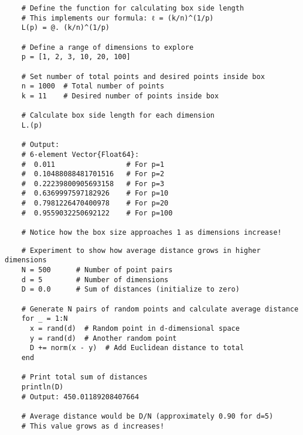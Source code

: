 \documentclass[12pt]{article}
\begin{document}
\begin{tcolorbox}[width=\textwidth, left=-6mm, sharp corners, boxrule=0pt, title=\textbf{Implementing the box size formula}]
  \begin{verbatim}
    # Define the function for calculating box side length
    # This implements our formula: ℓ = (k/n)^(1/p)
    L(p) = @. (k/n)^(1/p)
    
    # Define a range of dimensions to explore
    p = [1, 2, 3, 10, 20, 100]
    
    # Set number of total points and desired points inside box
    n = 1000  # Total number of points
    k = 11    # Desired number of points inside box
    
    # Calculate box side length for each dimension
    L.(p)
    
    # Output:
    # 6-element Vector{Float64}:
    #  0.011                 # For p=1
    #  0.10488088481701516   # For p=2
    #  0.22239800905693158   # For p=3
    #  0.6369997597182926    # For p=10
    #  0.7981226470400978    # For p=20
    #  0.9559032250692122    # For p=100
    
    # Notice how the box size approaches 1 as dimensions increase!
  \end{verbatim}
\end{tcolorbox}

\begin{tcolorbox}[width=\textwidth, left=-6mm, sharp corners, boxrule=0pt, title=\textbf{Experiment: Average distance in high dimensions}]
  \begin{verbatim}
    # Experiment to show how average distance grows in higher dimensions
    N = 500      # Number of point pairs
    d = 5        # Number of dimensions
    D = 0.0      # Sum of distances (initialize to zero)
    
    # Generate N pairs of random points and calculate average distance
    for _ = 1:N
      x = rand(d)  # Random point in d-dimensional space
      y = rand(d)  # Another random point
      D += norm(x - y)  # Add Euclidean distance to total
    end
    
    # Print total sum of distances
    println(D)
    # Output: 450.01189208407664
    
    # Average distance would be D/N (approximately 0.90 for d=5)
    # This value grows as d increases!
  \end{verbatim}
\end{tcolorbox}
\end{document}

